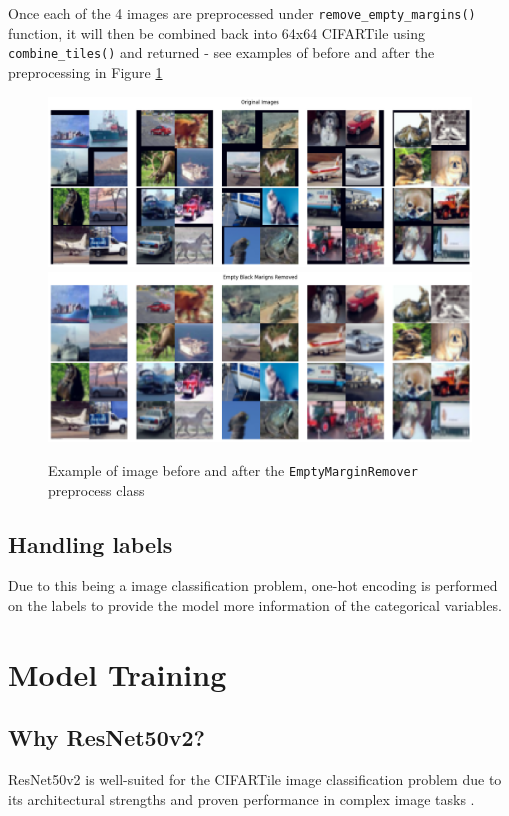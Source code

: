 \documentclass{article}
\begin{document}
Once each of the 4 images are preprocessed under 
\texttt{remove\_empty\_margins()} function, it will then be combined
back into 64x64 CIFARTile using \texttt{combine\_tiles()} and returned - 
see examples of before and after the preprocessing in Figure \ref{fig:before_and_after_preprocess}

\begin{figure}[H]
    \centering
    \includegraphics[width=0.7\linewidth]{images/before_preprocess.png}
    \includegraphics[width=0.7\linewidth]{images/after_preprocess.png}
    \caption{Example of image before and after the \texttt{EmptyMarginRemover} preprocess class}
    \label{fig:before_and_after_preprocess}
\end{figure}

\subsection{Handling labels} \label{handle_labels}

Due to this being a image classification problem, one-hot encoding is
performed on the labels to provide the model more information of the 
categorical variables.

\section{Model Training} \label{model training}

\subsection{Why ResNet50v2?}

ResNet50v2 is well-suited for the CIFARTile image classification problem 
due to its architectural strengths and proven performance in complex 
image tasks \cite{7780459, DBLP:journals/corr/HeZR016}.\\
\end{document}

